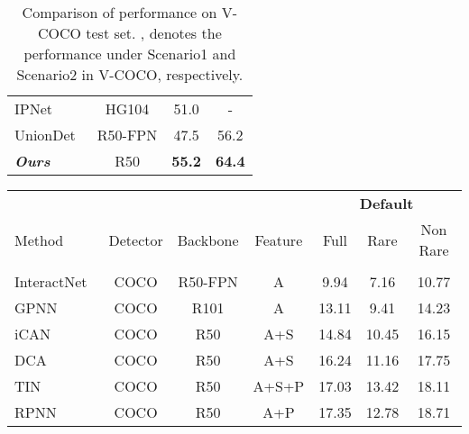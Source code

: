 \documentclass[final]{cvpr}
\begin{document}
\begin{table}[h!]
\begin{tabular}{l|c|c c}
    IPNet~\cite{wang2020learning} & HG104 & 51.0 & - \\
    UnionDet~\cite{bkim2020uniondet} & R50-FPN & 47.5 & 56.2 \\ \midrule
    \textit{\textbf{Ours}} & R50 & \textbf{55.2} & \textbf{64.4} \\
    \bottomrule
  \end{tabular}
  \vspace{3pt}
  \caption{Comparison of performance on V-COCO test set. ,  denotes the performance under Scenario1 and Scenario2 in V-COCO, respectively.}
  \label{tab:V-COCO role}
\end{table} \begin{table*}[h!]
  \centering
  \small
  \begin{tabular}{l c c c c c c}
    \toprule
    \multicolumn{4}{c}{} & \multicolumn{3}{c}{\textbf{Default}} \\
    \cmidrule(r){5-7}
    Method & \hspace{12pt}Detector\hspace{12pt} & Backbone & \hspace{12pt}Feature\hspace{12pt} & \hspace{12pt}Full\hspace{12pt} & \hspace{6pt}Rare\hspace{6pt} & Non Rare\hspace{6pt} \\ \midrule\hline
    \rowcolor[gray]{0.85}\multicolumn{7}{l}{\textit{\textbf{Sequential HOI Detectors}}} \\ \hline
\multicolumn{1}{l|}{InteractNet~\cite{gkioxari2018detecting}} & COCO & R50-FPN & \multicolumn{1}{c|}{A} & 9.94 & 7.16 & 10.77  \\
    \multicolumn{1}{l|}{GPNN~\cite{qi2018learning}} & COCO & R101 & \multicolumn{1}{c|}{A} & 13.11 & 9.41 & 14.23  \\
\multicolumn{1}{l|}{iCAN~\cite{gao2018ican}} & COCO & R50 & \multicolumn{1}{c|}{A+S} & 14.84 & 10.45 & 16.15  \\
    \multicolumn{1}{l|}{DCA~\cite{wang2019deep}} & COCO & R50 & \multicolumn{1}{c|}{A+S} & 16.24 & 11.16 & 17.75  \\
    \multicolumn{1}{l|}{TIN~\cite{li2019transferable}} & COCO & R50 & \multicolumn{1}{c|}{A+S+P} & 17.03 & 13.42 & 18.11  \\
    \multicolumn{1}{l|}{RPNN~\cite{zhou2019relation}} & COCO & R50 & \multicolumn{1}{c|}{A+P} & 17.35 & 12.78 & 18.71  \\

\end{tabular}
\end{table*}
\end{document}
